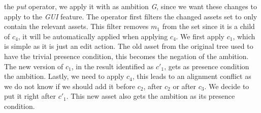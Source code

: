 the \emph{put} operator, we apply it with as ambition \emph{G}, since we want
these changes to apply to the \emph{GUI} feature. The operator first filters the
changed assets set to only contain the relevant assets. This filter removes $m_1$
from the set since it is a child of $c_4$, it will be automatically applied when
applying $c_4$. We first apply $c_1$, which is simple as it is just an edit action.
The old asset from the original tree used to have the trivial presence condition,
this becomes the negation of the ambition. The new version of $c_1$, in the result
identified as $c'_1$, gets as presence condition the ambition. Lastly, we need to
apply $c_4$, this leads to an alignment conflict as we do not know if we should add
it before $c_2$, after $c_2$ or after $c_3$. We decide to put it right after $c'_1$.
This new asset also gets the ambition as its presence condition.
